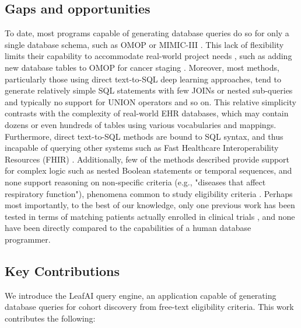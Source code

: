 \documentclass[../main.tex]{subfiles}
\begin{document}
\subsection{Gaps and opportunities}

To date, most programs capable of generating database queries do so for only a single database schema, such as OMOP or MIMIC-III \cite{johnson2016mimic}. This lack of flexibility limits their capability to accommodate real-world project needs \cite{belenkaya2021extending, peng2021towards, zoch2021adaption, warner2019hemonc, zhou2013evaluation, shin2019genomic, kwon2019development}, such as adding new database tables to OMOP for cancer staging \cite{belenkaya2021extending}. Moreover, most methods, particularly those using direct text-to-SQL deep learning approaches, tend to generate relatively simple SQL statements with few JOINs or nested sub-queries and typically no support for UNION operators and so on. This relative simplicity contrasts with the complexity of real-world EHR databases, which may contain dozens or even hundreds of tables using various vocabularies and mappings. Furthermore, direct text-to-SQL methods are bound to SQL syntax, and thus incapable of querying other systems such as Fast Healthcare Interoperability Resources (FHIR) \cite{bender2013hl7}. Additionally, few of the methods described provide support for complex logic such as nested Boolean statements or temporal sequences, and none support reasoning on non-specific criteria (e.g., "diseases that affect respiratory function"), phenomena common to study eligibility criteria \cite{wang2017classifying, ross2010analysis}. Perhaps most importantly, to the best of our knowledge, only one previous work has been tested in terms of matching patients actually enrolled in clinical trials \cite{zhang2020deepenroll}, and none have been directly compared to the capabilities of a human database programmer.

\subsection{Key Contributions}

We introduce the LeafAI query engine, an application capable of generating database queries for cohort discovery from free-text eligibility criteria. This work contributes the following:
\end{document}
